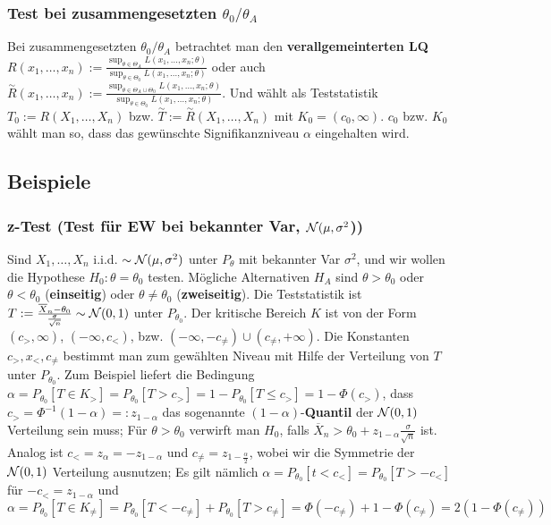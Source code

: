 \subsubsection{Test bei zusammengesetzten $\theta_0/\theta_A$}
Bei zusammengesetzten $\theta_0/\theta_A$ betrachtet man den \textbf{verallgemeinterten LQ} $R(x_1, \dots, x_n) := \frac{\sup_{\theta \in \Theta_A} L(x_1, \dots, x_n; \theta)}{\sup_{\theta \in \Theta_0}L(x_1, \dots, x_n; \theta)}$ oder auch $\overset{\sim}{R}(x_1, \dots, x_n) := \frac{\sup_{\theta \in \Theta_A \cup \Theta_0} L(x_1, \dots, x_n; \theta)}{\sup_{\theta \in \Theta_0}L(x_1, \dots, x_n; \theta)}$. Und wählt als Teststatistik $T_0 := R(X_1, \dots, X_n)$ bzw. $\overset{\sim}{T} := \overset{\sim}{R}(X_1, \dots, X_n)$ mit $K_0 = (c_0, \infty)$. $c_0$ bzw. $K_0$ wählt man so, dass das gewünschte Signifikanzniveau $\alpha$ eingehalten wird.

\subsection{Beispiele}
\subsubsection{z-Test (Test für EW bei bekannter Var, $\mathcal{N}(\mu, \sigma^2$))}
Sind $X_1, \dots, X_n$ i.i.d. $\sim \mathcal{N}(\mu, \sigma^2)$ unter $P_\theta$ mit bekannter Var $\sigma^2$, und wir wollen die Hypothese $H_0: \theta = \theta_0$ testen. Mögliche Alternativen $H_A$ sind $\theta > \theta_0$ oder $\theta < \theta_0$ (\textbf{einseitig}) oder $\theta \neq \theta_0$ (\textbf{zweiseitig}). Die Teststatistik ist $T := \frac{\overline{X}_n - \theta_0}{\frac{\sigma}{\sqrt{n}}} \sim \mathcal{N}(0, 1)$ unter $P_{\theta_0}$. Der kritische Bereich $K$ ist von der Form $(c_>, \infty)$, $(-\infty, c_<)$, bzw. $(-\infty, -c_{\neq}) \cup (c_{\neq}, + \infty)$. Die Konstanten $c_>, x_<, c_{\neq}$ bestimmt man zum gewählten Niveau mit Hilfe der Verteilung von $T$ unter $P_{\theta_0}$. Zum Beispiel liefert die Bedingung $\alpha = P_{\theta_0}[T \in K_>] = P_{\theta_0}[T > c_>] = 1 - P_{\theta_0}[T \le c_>] = 1 - \Phi(c_>)$, dass $c_> = \Phi^{-1}(1 - \alpha) =: z_{1 - \alpha}$ das sogenannte $(1 - \alpha)$-\textbf{Quantil} der $\mathcal{N}(0, 1)$ Verteilung sein muss; Für $\theta > \theta_0$ verwirft man $H_0$, falls $\overline{X}_n > \theta_0 + z_{1 - \alpha} \frac{\sigma}{\sqrt{n}}$ ist. Analog ist $c_< = z_\alpha = -z_{1 - \alpha}$ und $c_{\neq} = z_{1 - \frac{\alpha}{2}}$, wobei wir die Symmetrie der $\mathcal{N}(0, 1)$ Verteilung ausnutzen; Es gilt nämlich $\alpha = P_{\theta_0}[t < c_<] = P_{\theta_0}[T > -c_<]$ für $-c_< = z_{1 - \alpha}$ und $\alpha = P_{\theta_0}[T \in K_{\neq}] = P_{\theta_0} [T < -c_{\neq}] + P_{\theta_0}[T > c_{\neq}] = \Phi(-c_{\neq}) + 1 - \Phi(c_{\neq}) = 2(1 - \Phi(c_{\neq}))$

